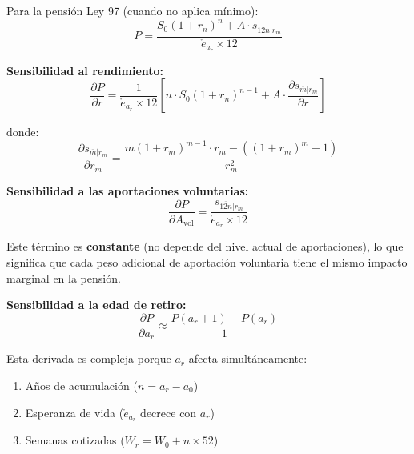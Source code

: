 \documentclass[11pt,a4paper]{report}
\theoremstyle{remark}
\begin{document}
\begin{tcolorbox}[colback=blue!5!white, colframe=blue!75!black, title=\textbf{Definici\'on Formal}]
Para la pensi\'on Ley 97 (cuando no aplica m\'inimo):
\begin{equation}
P = \frac{S_0(1+r_n)^n + A \cdot s_{\overline{12n}|r_m}}{\mathring{e}_{a_r} \times 12}
\end{equation}

\textbf{Sensibilidad al rendimiento:}
\begin{equation}
\frac{\partial P}{\partial r} = \frac{1}{\mathring{e}_{a_r} \times 12} \left[ n \cdot S_0(1+r_n)^{n-1} + A \cdot \frac{\partial s_{\overline{m}|r_m}}{\partial r} \right]
\end{equation}

donde:
\begin{equation}
\frac{\partial s_{\overline{m}|r_m}}{\partial r_m} = \frac{m(1+r_m)^{m-1} \cdot r_m - ((1+r_m)^m - 1)}{r_m^2}
\end{equation}

\textbf{Sensibilidad a las aportaciones voluntarias:}
\begin{equation}
\frac{\partial P}{\partial A_{\text{vol}}} = \frac{s_{\overline{12n}|r_m}}{\mathring{e}_{a_r} \times 12}
\label{eq:sensibilidad_vol}
\end{equation}

Este t\'ermino es \textbf{constante} (no depende del nivel actual de aportaciones), lo que significa que cada peso adicional de aportaci\'on voluntaria tiene el mismo impacto marginal en la pensi\'on.

\textbf{Sensibilidad a la edad de retiro:}
\begin{equation}
\frac{\partial P}{\partial a_r} \approx \frac{P(a_r + 1) - P(a_r)}{1}
\end{equation}

Esta derivada es compleja porque $a_r$ afecta simult\'aneamente:
\begin{enumerate}
  \item A\~nos de acumulaci\'on ($n = a_r - a_0$)
  \item Esperanza de vida ($\mathring{e}_{a_r}$ decrece con $a_r$)
  \item Semanas cotizadas ($W_r = W_0 + n \times 52$)
\end{enumerate}
\end{tcolorbox}
\end{document}
